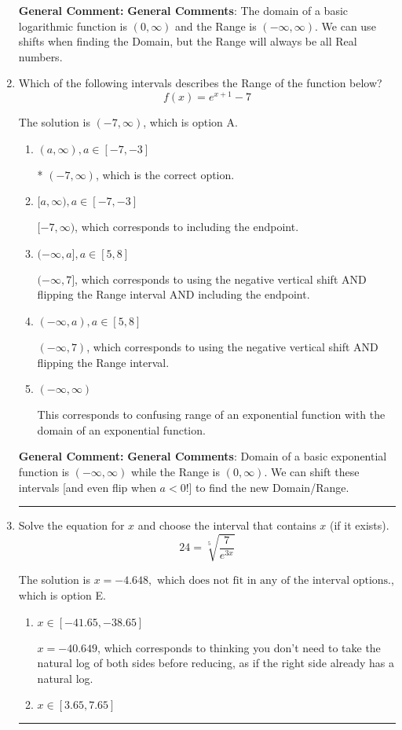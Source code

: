 \documentclass{extbook}[14pt]
\newcommand{\litem}[1]{\item #1

\rule{\textwidth}{0.4pt}}
\begin{document}
\begin{enumerate}
{\textbf{General Comment:} \textbf{General Comments}: The domain of a basic logarithmic function is $(0, \infty)$ and the Range is $(-\infty, \infty)$. We can use shifts when finding the Domain, but the Range will always be all Real numbers.
}
\litem{
Which of the following intervals describes the Range of the function below?
\[ f(x) = e^{x+1}-7 \]

The solution is \( (-7, \infty) \), which is option A.\begin{enumerate}[label=\Alph*.]
\item \( (a, \infty), a \in [-7, -3] \)

* $(-7, \infty)$, which is the correct option.
\item \( [a, \infty), a \in [-7, -3] \)

$[-7, \infty)$, which corresponds to including the endpoint.
\item \( (-\infty, a], a \in [5, 8] \)

$(-\infty, 7]$, which corresponds to using the negative vertical shift AND flipping the Range interval AND including the endpoint.
\item \( (-\infty, a), a \in [5, 8] \)

$(-\infty, 7)$, which corresponds to using the negative vertical shift AND flipping the Range interval.
\item \( (-\infty, \infty) \)

This corresponds to confusing range of an exponential function with the domain of an exponential function.
\end{enumerate}

\textbf{General Comment:} \textbf{General Comments}: Domain of a basic exponential function is $(-\infty, \infty)$ while the Range is $(0, \infty)$. We can shift these intervals [and even flip when $a<0$!] to find the new Domain/Range.
}
\litem{
 Solve the equation for $x$ and choose the interval that contains $x$ (if it exists).
\[  24 = \sqrt[5]{\frac{7}{e^{3x}}} \]

The solution is \( x = -4.648, \text{ which does not fit in any of the interval options.} \), which is option E.\begin{enumerate}[label=\Alph*.]
\item \( x \in [-41.65, -38.65] \)

$x = -40.649$, which corresponds to thinking you don't need to take the natural log of both sides before reducing, as if the right side already has a natural log.
\item \( x \in [3.65, 7.65] \)


\end{enumerate}}
\end{enumerate}
\end{document}
